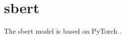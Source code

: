 \section{\ac{sbert}}\label{sec:impl-sbert}

The \ac{sbert} model is based on PyTorch \cite{HfsentTrans2019}.